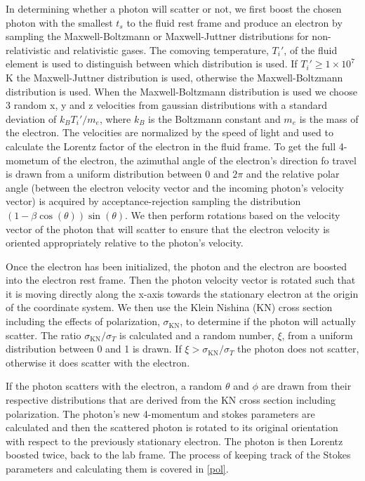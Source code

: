 \documentclass[12pt,a4paper]{article}
\begin{document}
In determining whether a photon will scatter or not, we first boost the chosen photon with the smallest $t_s$ to the fluid rest frame and produce an electron by sampling the Maxwell-Boltzmann or Maxwell-Juttner distributions for non-relativistic and relativistic gases. The comoving temperature, $T_i'$, of the fluid element is used to distinguish between which distribution is used. If $T_i' \ge 1 \times 10^7$ K the Maxwell-Juttner distribution is used, otherwise the Maxwell-Boltzmann distribution is used. When the Maxwell-Boltzmann distribution is used we choose 3 random x, y and z velocities from gaussian distributions with a standard deviation of $k_BT_i'/m_e$, where $k_B$ is the Boltzmann constant and $m_e$ is the mass of the electron. The velocities are normalized by the speed of light and used to calculate the Lorentz factor of the electron in the fluid frame. To get the full 4-mometum of the electron, the azimuthal angle of the electron's direction fo travel is drawn from a uniform distribution between 0 and $2\pi$ and the relative polar angle (between the electron velocity vector and the incoming photon's velocity vector) is acquired by acceptance-rejection sampling the distribution $(1-\beta\cos(\theta))\sin(\theta) $. We then perform rotations based on the velocity vector of the photon that will scatter to ensure that the electron velocity is oriented appropriately relative to the photon's velocity.

Once the electron has been initialized, the photon and the electron are boosted into the electron rest frame. Then the photon velocity vector is rotated such that it is moving directly along the x-axis towards the stationary electron at the origin of the coordinate system. We then use the Klein Nishina (KN) cross section including the effects of polarization, $\sigma_\mathrm{KN}$, to determine if the photon will actually scatter. The ratio $\sigma_\mathrm{KN}/\sigma_T$ is calculated and a random number, $\xi$, from a uniform distribution between 0 and 1 is drawn. If $\xi >\sigma_\mathrm{KN}/\sigma_T $ the photon does not scatter, otherwise it does scatter with the electron. 

If the photon scatters with the electron, a random $\theta$ and $\phi$ are drawn from their respective distributions that are derived from the KN cross section including polarization. The photon's new 4-momentum and stokes parameters are calculated and then the scattered photon is rotated to its original orientation with respect to the previously stationary electron. The photon is then Lorentz boosted twice, back to the lab frame. The process of keeping track of the Stokes parameters and calculating them is covered in \autoref{pol}.
\end{document}
